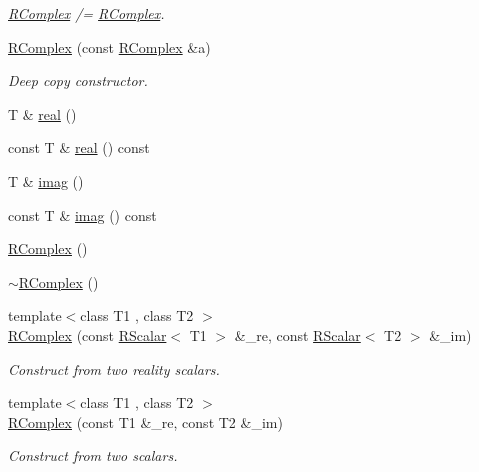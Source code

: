 \begin{DoxyCompactItemize}
\begin{DoxyCompactList}\small\item\em \mbox{\hyperlink{classENSEM_1_1RComplex}{R\+Complex}} /= \mbox{\hyperlink{classENSEM_1_1RComplex}{R\+Complex}}. \end{DoxyCompactList}\item 
\mbox{\hyperlink{classENSEM_1_1RComplex_acfff70ac44afad9aa6848f117f86b675}{R\+Complex}} (const \mbox{\hyperlink{classENSEM_1_1RComplex}{R\+Complex}} \&a)
\begin{DoxyCompactList}\small\item\em Deep copy constructor. \end{DoxyCompactList}\item 
T \& \mbox{\hyperlink{classENSEM_1_1RComplex_a1675e3defa774edeb1a7390bd14a86c8}{real}} ()
\item 
const T \& \mbox{\hyperlink{classENSEM_1_1RComplex_a0a055b8b16ef4c73ab5fb4e5ff93c7f1}{real}} () const
\item 
T \& \mbox{\hyperlink{classENSEM_1_1RComplex_af4f97cf18c025407a8e66f848252243d}{imag}} ()
\item 
const T \& \mbox{\hyperlink{classENSEM_1_1RComplex_a8df643a2ba06dc851d19eb35cd4c4cde}{imag}} () const
\item 
\mbox{\hyperlink{classENSEM_1_1RComplex_a5c5fc0c5c776dc45229f8702053962e5}{R\+Complex}} ()
\item 
\mbox{\hyperlink{classENSEM_1_1RComplex_a6e888c12c12f117dab2c0fd122b7b8d7}{$\sim$\+R\+Complex}} ()
\item 
{\footnotesize template$<$class T1 , class T2 $>$ }\\\mbox{\hyperlink{classENSEM_1_1RComplex_aec74e0e2dcf90ad4b575285662713b9c}{R\+Complex}} (const \mbox{\hyperlink{classENSEM_1_1RScalar}{R\+Scalar}}$<$ T1 $>$ \&\+\_\+re, const \mbox{\hyperlink{classENSEM_1_1RScalar}{R\+Scalar}}$<$ T2 $>$ \&\+\_\+im)
\begin{DoxyCompactList}\small\item\em Construct from two reality scalars. \end{DoxyCompactList}\item 
{\footnotesize template$<$class T1 , class T2 $>$ }\\\mbox{\hyperlink{classENSEM_1_1RComplex_aa67055e36f9e7d7709eb98453901b0ba}{R\+Complex}} (const T1 \&\+\_\+re, const T2 \&\+\_\+im)
\begin{DoxyCompactList}\small\item\em Construct from two scalars. \end{DoxyCompactList}\item 

\end{DoxyCompactItemize}
